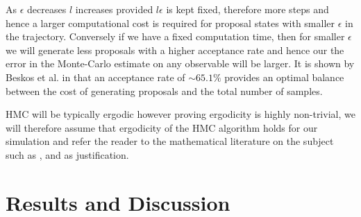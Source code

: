 \documentclass[12pt]{article}
\begin{document}
            As $\epsilon$ decreases $l$ increases provided $l\epsilon$ is kept fixed, therefore more steps and hence a larger computational cost is required for proposal states with smaller $\epsilon$ in the trajectory. Conversely if we have a fixed computation time, then for smaller $\epsilon$ we will generate less proposals with a higher acceptance rate and hence our the error in the Monte-Carlo estimate on any observable will be larger. It is shown by Beskos et al. in \cite{beskos_pillai_roberts_sanz-serna_stuart_2013} that an acceptance rate of $\sim 65.1\%$ provides an optimal balance between the cost of generating proposals and the total number of samples.

            HMC will be typically ergodic \cite{neal_2011} however proving ergodicity is highly non-trivial, we will therefore assume that ergodicity of the HMC algorithm holds for our simulation and refer the reader to the mathematical literature on the subject such as \cite{bou-rabee_sanz-serna_2017}, \cite{durmus_moulines_saksman} and \cite{livingstone_betancourt_byrne_girolami} as justification.
          

            

            
\section{Results and Discussion}
\end{document}
